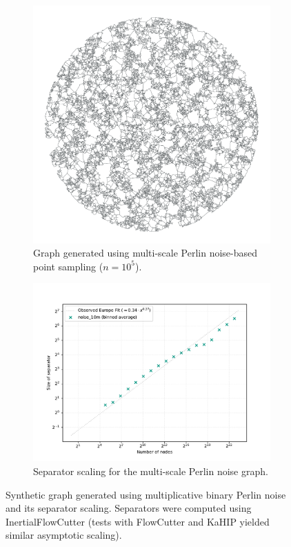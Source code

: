 \begin{figure}[tbhp]
	\centering
	\begin{subfigure}{0.35\linewidth}
		\centering
		\includegraphics[width=\linewidth]{graphics/noise.png}
		\caption{Graph generated using multi-scale Perlin noise-based point sampling (\(n = 10^5\)).}
		\label{fig:fractal_noise_graph_viz}
	\end{subfigure}
	\hfill
	\begin{subfigure}{0.55\linewidth}
		\centering
		\includegraphics[width=\linewidth]{graphics/noise_10m.pdf}
		\caption{Separator scaling for the multi-scale Perlin noise graph.}
		\label{fig:fractal_noise_graph_sep_plot}
	\end{subfigure}
	\caption{Synthetic graph generated using multiplicative binary Perlin noise and its separator scaling. Separators were computed using InertialFlowCutter (tests with FlowCutter and KaHIP yielded similar asymptotic scaling).}
	\label{fig:fractal_noise_graph_results}
\end{figure}

